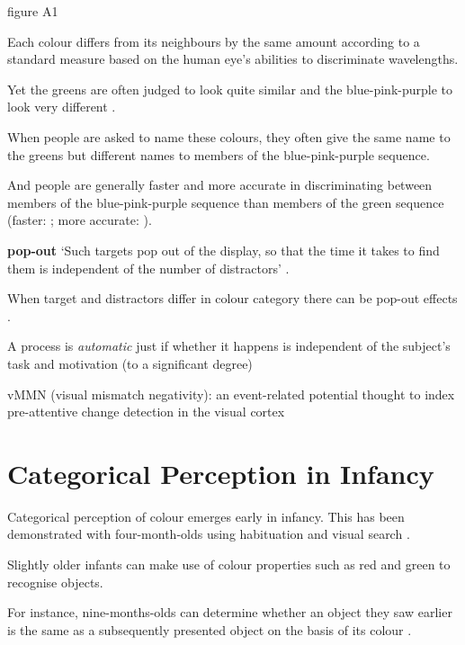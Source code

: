 \documentclass[12pt]{extarticle}
\begin{document}
\begin{multicols}{3}
\begin{center}
    
\end{center}

    
\begin{center} \citealp{Daoutis:2006ij} figure A1 \end{center}
 
Each colour differs from its neighbours by the same amount according to a standard measure based on the human eye's abilities to discriminate wavelengths.
 
Yet the greens are often judged to look quite similar and the blue-pink-purple to look very different \citep[p.\ 12--7]{Roberson:1999rk}.

    
When people are asked to name these colours, they often give the same name to the greens but different names to members of the blue-pink-purple sequence.

    
And people are generally faster and more accurate in discriminating between members of the blue-pink-purple sequence than members of the green sequence (faster: \citealp{Bornstein:1984cb}; more accurate: \citealp[p.\ 22--7]{Roberson:1999rk}).
 
\textbf{pop-out} ‘Such targets pop out of the display, so that the time it takes to find them is independent of the number of distractors’ \citep[p.\ 117]{Treisman:1986pm}.
 
When target and distractors differ in colour category there can be pop-out effects \citep{Daoutis:2006qk}.
 
A process is \emph{automatic} just if
whether it happens is independent of the subject’s task and motivation (to a significant degree)
 
vMMN (visual mismatch negativity): an event-related potential  thought to index pre-attentive change detection in the visual cortex

 
 
 
\section{Categorical Perception in Infancy}
 
Categorical perception of colour emerges early in infancy.  This has been demonstrated with four-month-olds using habituation \citep{Bornstein:1976of} and visual search \citep{Franklin:2005xk}.
 
Slightly older infants can make use of colour properties such as red and green to recognise objects.
 
For instance, nine-months-olds can determine whether an object they saw earlier is the same as a subsequently presented object on the basis of its colour \citep{Wilcox:2008jk}.
 

\end{multicols}
\end{document}
